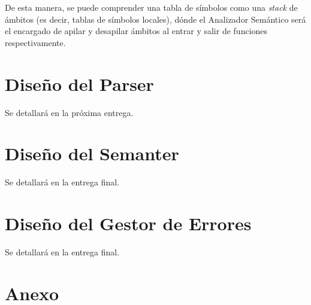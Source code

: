 \documentclass[a4paper]{CSMakotoTechnicalReport}
\begin{document}
    De esta manera, se puede comprender una tabla de símbolos como una \textit{stack} de ámbitos (es decir, tablas de símbolos locales), dónde el Analizador Semántico será el encargado de apilar y desapilar ámbitos al entrar y salir de funciones respectivamente.

    \section{Diseño del Parser}
    Se detallará en la próxima entrega.

    \section{Diseño del Semanter}
    Se detallará en la entrega final.

    \section{Diseño del Gestor de Errores}
    Se detallará en la entrega final.


\newpage

\section*{Anexo}
\end{document}
